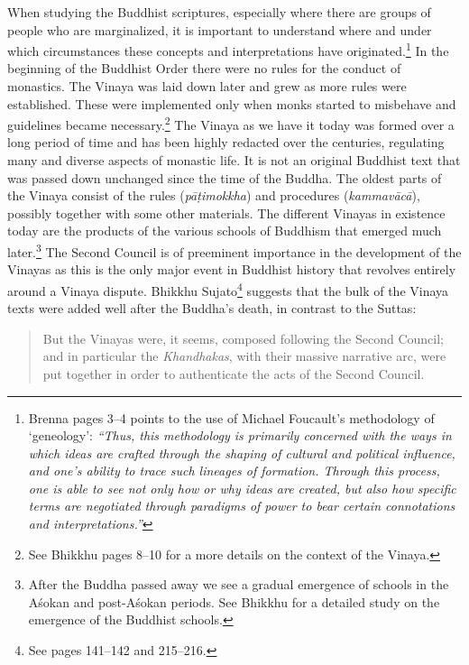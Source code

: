 When studying the Buddhist scriptures, especially where there are groups of people who are marginalized, it is important to understand where and under which circumstances these concepts and interpretations have originated.\footnote{Brenna \cite{artinger} pages 3–4 points to the use of Michael Foucault's methodology of `geneology': {\em ``Thus, this methodology is primarily concerned with the ways in which ideas are crafted through the shaping of cultural and political influence, and one's ability to trace such lineages of formation. Through this process, one is able to see not only how or why ideas are created, but also how specific terms are negotiated through paradigms of power to bear certain connotations and interpretations.''}}
In the beginning of the Buddhist Order there were no rules for the conduct of monastics. The Vinaya was laid down later and grew as more rules were established. These were implemented only when monks started to misbehave and guidelines became necessary.\footnote{See Bhikkhu \cite{sujato2009} pages 8–10 for a more details on the context of the Vinaya.} The Vinaya as we have it today was formed over a long period of time and has been highly redacted over the centuries, regulating many and diverse aspects of monastic life. It is not an original Buddhist text that was passed down unchanged since the time of the Buddha. The oldest parts of the Vinaya consist of the rules ({\em pāṭimokkha}) and procedures ({\em kammavācā}), possibly together with some other materials. The different Vinayas in existence today are the products of the various schools of Buddhism that emerged much later.\footnote{After the Buddha passed away we see a gradual emergence of schools in the Aśokan and post-Aśokan periods. See Bhikkhu \cite{sujato2012} for a detailed study on the emergence of the Buddhist schools.} The Second Council is of preeminent importance in the development of the Vinayas as this is the only major event in Buddhist history that revolves entirely around a Vinaya dispute. Bhikkhu Sujato\footnote{See \cite{sujato2009} pages 141–142 and 215–216.} suggests that the bulk of the Vinaya texts were added well after the Buddha's death, in contrast to the Suttas: 

\begin{quote}
But the Vinayas were, it seems, composed following the Second Council; and in particular the {\em Khandhakas}, with their massive narrative arc, were put together in order to authenticate the acts of the Second Council.
\end{quote}

